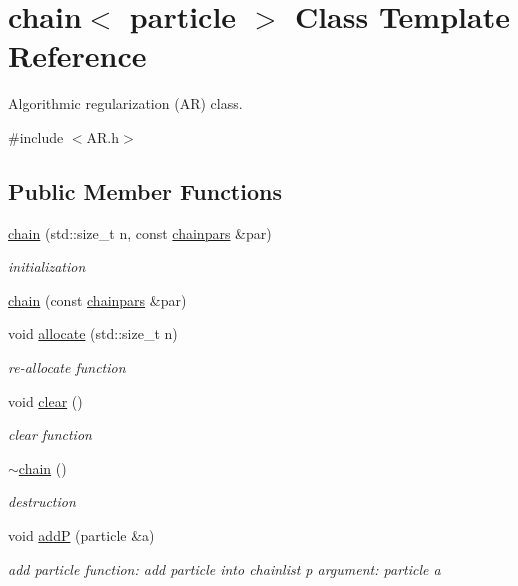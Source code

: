 \hypertarget{classchain}{}\section{chain$<$ particle $>$ Class Template Reference}
\label{classchain}


Algorithmic regularization (AR) class.  




{\ttfamily \#include $<$A\+R.\+h$>$}

\subsection*{Public Member Functions}
\begin{DoxyCompactItemize}
\item 
\hyperlink{classchain_a64c82c65e14b76682bceb525bb1801f7}{chain} (std\+::size\+\_\+t n, const \hyperlink{classchainpars}{chainpars} \&par)
\begin{DoxyCompactList}\small\item\em initialization \end{DoxyCompactList}\item 
\hyperlink{classchain_a6cca333a0d626f8ac763e1dc5d1d35ea}{chain} (const \hyperlink{classchainpars}{chainpars} \&par)
\item 
void \hyperlink{classchain_a396b6a6ce8ed5e92dab4b6cf8ee0008d}{allocate} (std\+::size\+\_\+t n)
\begin{DoxyCompactList}\small\item\em re-\/allocate function \end{DoxyCompactList}\item 
void \hyperlink{classchain_a63d5a11da8c3f0e0024fea9e8f2774bb}{clear} ()
\begin{DoxyCompactList}\small\item\em clear function \end{DoxyCompactList}\item 
\hyperlink{classchain_acf3aeeb136a915e80e17aa4221c822a7}{$\sim$chain} ()
\begin{DoxyCompactList}\small\item\em destruction \end{DoxyCompactList}\item 
void \hyperlink{classchain_a859cdc2249ee280069aa997d455c063b}{addP} (particle \&a)
\begin{DoxyCompactList}\small\item\em add particle function\+: add particle into chainlist p argument\+: particle a \end{DoxyCompactList}\item 

\end{DoxyCompactItemize}

